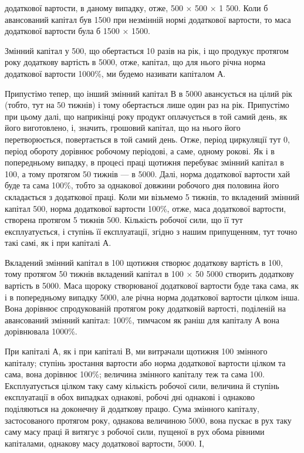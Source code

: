 \parcont{}  %
додаткової вартости, в даному випадку, отже, 500 ×  \deq{} 500 × 1 \deq{} 500. Коли б
авансований капітал був \deq{} 1500 при незмінній
нормі додаткової вартости, то маса додаткової вартости була б \deq{}
1500 ×  \deq{} 1500.

Змінний капітал у 500, що обертається 10 разів на рік, і
що продукує протягом року додаткову вартість в 5000, отже,
капітал, що для нього річна норма додаткової вартости \deq{} 1000\%, ми
будемо називати капіталом $А$.

Припустімо тепер, що інший змінний капітал $В$ в 5000
авансується на цілий рік (тобто, тут на 50 тижнів) і тому обертається
лише один раз на рік. Припустімо при цьому далі, що наприкінці року
продукт оплачується в той самий день, як його виготовлено, і, значить,
грошовий капітал, що на нього його перетворюється, повертається в той
самий день. Отже, період циркуляції тут \deq{} 0, період обороту дорівнює
робочому періодові, а саме, одному рокові. Як і в попередньому випадку,
в процесі праці щотижня перебуває змінний капітал в 100,
а тому протягом 50 тижнів — в 5000. Далі, норма додаткової
вартости хай буде та сама \deq{} 100\%, тобто за однакової довжини робочого
дня половина його складається з додаткової праці. Коли ми візьмемо
5 тижнів, то вкладений змінний капітал \deq{} 500, норма додаткової
вартости \deq{} 100\%, отже, маса додаткової вартости, створена протягом
5 тижнів \deq{} 500. Кількість робочої сили, що її тут експлуатується,
і ступінь її експлуатації, згідно з нашим припущенням, тут
точно такі самі, як і при капіталі $А$.

Вкладений змінний капітал в 100 щотижня створює додаткову
вартість в 100, тому протягом 50 тижнів вкладений капітал
в 100 × 50 \deq{} 5000 створить додаткову вартість в 5000. Маса щороку створюваної
додаткової вартости буде така сама, як і в попередньому випадку \deq{} 5000, але річна норма
додаткової
вартости цілком інша. Вона дорівнює спродукованій протягом року
додатковій вартості, поділеній на авансований змінний капітал:
 \deq{} 100\%, тимчасом як раніш для капіталу $А$ вона дорівнювала 1000\%.

При капіталі $А$, як і при капіталі $В$, ми витрачали щотижня 100 змінного капіталу; ступінь
зростання вартости або норма додаткової
вартости цілком та сама, вона дорівнює 100\%; величина змінного
капіталу теж та сама \deq{} 100. Експлуатується цілком таку
саму кількість робочої сили, величина й ступінь експлуатації в обох випадках
однакові, робочі дні однакові і однаково поділяються на доконечну
й додаткову працю. Сума змінного капіталу, застосованого протягом
року, однакова величиною \deq{} 5000, вона пускає в рух таку
саму масу праці й витягує з робочої сили, пущеної в рух обома рівними
капіталами, однакову масу додаткової вартости, 5000. І,
\parbreak{}  %
